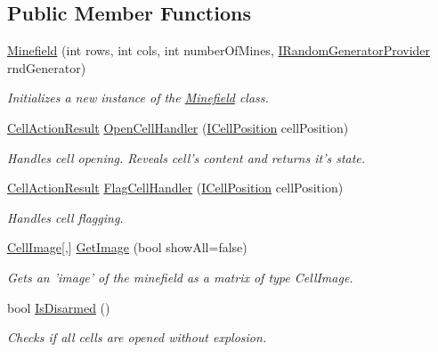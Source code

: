 \subsection*{Public Member Functions}
\begin{DoxyCompactItemize}
\item 
\hyperlink{class_minesweeper_1_1_game_1_1_minefield_ae13f75c03811d1808701a96b0daac034}{Minefield} (int rows, int cols, int number\+Of\+Mines, \hyperlink{interface_minesweeper_1_1_lib_1_1_i_random_generator_provider}{I\+Random\+Generator\+Provider} rnd\+Generator)
\begin{DoxyCompactList}\small\item\em Initializes a new instance of the \hyperlink{class_minesweeper_1_1_game_1_1_minefield}{Minefield} class. \end{DoxyCompactList}\item 
\hyperlink{namespace_minesweeper_af85e37deff295959aea34f4226d8ba93}{Cell\+Action\+Result} \hyperlink{class_minesweeper_1_1_game_1_1_minefield_a4238ded437c9cdf9fdfa5efb9be0e48f}{Open\+Cell\+Handler} (\hyperlink{interface_minesweeper_1_1_lib_1_1_i_cell_position}{I\+Cell\+Position} cell\+Position)
\begin{DoxyCompactList}\small\item\em Handles cell opening. Reveals cell's content and returns it's state. \end{DoxyCompactList}\item 
\hyperlink{namespace_minesweeper_af85e37deff295959aea34f4226d8ba93}{Cell\+Action\+Result} \hyperlink{class_minesweeper_1_1_game_1_1_minefield_a78fbb274c5004164c1eaf03564d5a8aa}{Flag\+Cell\+Handler} (\hyperlink{interface_minesweeper_1_1_lib_1_1_i_cell_position}{I\+Cell\+Position} cell\+Position)
\begin{DoxyCompactList}\small\item\em Handles cell flagging. \end{DoxyCompactList}\item 
\hyperlink{namespace_minesweeper_adf92d608047dafd69d16008492d317bd}{Cell\+Image}\mbox{[},\mbox{]} \hyperlink{class_minesweeper_1_1_game_1_1_minefield_a8bcfdd40f65d4c1c5e00565c880c8aa9}{Get\+Image} (bool show\+All=false)
\begin{DoxyCompactList}\small\item\em Gets an 'image' of the minefield as a matrix of type Cell\+Image. \end{DoxyCompactList}\item 
bool \hyperlink{class_minesweeper_1_1_game_1_1_minefield_a41bbc89242ced88cca3171e0c57fb50e}{Is\+Disarmed} ()
\begin{DoxyCompactList}\small\item\em Checks if all cells are opened without explosion. \end{DoxyCompactList}\end{DoxyCompactItemize}

